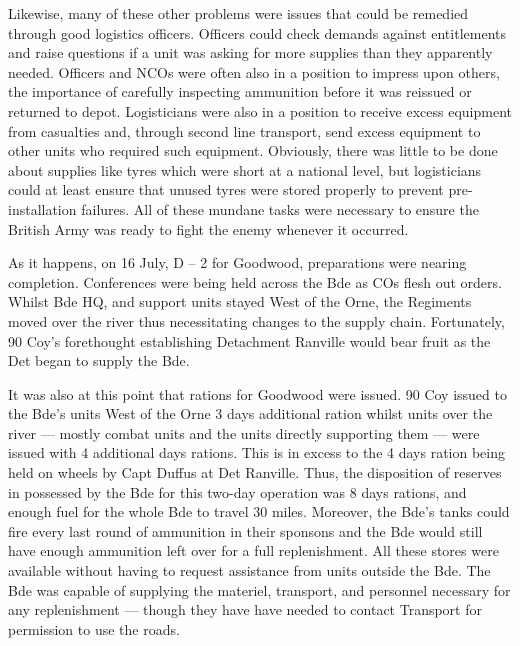 \documentclass[noraggedright]{turabian-researchpaper}
\begin{document}
Likewise, many of these other problems were issues that could be remedied
through good logistics officers.  Officers could check demands against 
entitlements and raise questions if a unit was asking for more supplies than
they apparently needed.  Officers and NCOs were often also in a position to
impress upon others, the importance of carefully inspecting ammunition before 
it was reissued or returned to depot. %
Logisticians were also in a position to receive excess equipment from 
casualties and, through second line transport, send excess equipment to other
units who required such equipment.  Obviously, there was little to be done 
about supplies like tyres which were short at a national level, but 
logisticians could at least ensure that unused tyres were stored properly to 
prevent pre-installation failures.  All of these mundane tasks were necessary 
to ensure the British Army was ready to fight the enemy whenever it occurred.

As it happens, on 16 July, D -- 2 for Goodwood, preparations were nearing 
completion.  Conferences were being held across the Bde as COs flesh out
orders.  Whilst Bde HQ, and support units stayed West of the Orne, the 
Regiments moved over the river thus necessitating changes to the supply 
chain. %
Fortunately, 90 Coy's forethought establishing Detachment Ranville would 
bear fruit as the Det began to supply the Bde. 

It was also at this point that rations for Goodwood were issued.  90 Coy 
issued to the Bde's units West of the Orne 3 days additional ration whilst 
units over the river --- mostly combat units and the units directly 
supporting them --- were issued with 4 additional days rations.\autocite[16
July 1944]{90wd} This is in excess to the 4 days ration being held
on wheels by Capt Duffus at Det Ranville.  Thus, the disposition of reserves
in possessed by the Bde for this two-day operation was 8 days rations, and 
enough fuel for the whole Bde to travel 30 miles.  Moreover, the Bde's tanks
could fire every last round of ammunition in their sponsons and the Bde would
still have enough ammunition left over for a full replenishment.  All these 
stores were available without having to request assistance from units outside 
the Bde.  The Bde was capable of supplying the materiel, 
transport, and personnel necessary for any replenishment --- though they
have have needed to contact Transport for permission to use the roads.  
\end{document}
